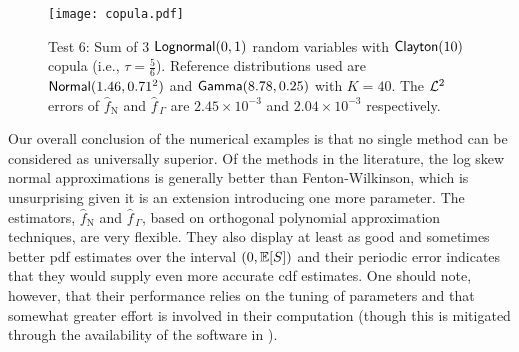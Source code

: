 \begin{figure}
\centering
\texttt{[image: copula.pdf]}
\caption*{Test 6: Sum of 3 $\mathsf{Lognormal}(0,1)$ random variables with $\mathsf{Clayton}(10)$ copula (i.e., $\tau = \frac56$). Reference distributions used are $\mathsf{Normal}(1.46,0.71^2)$ and $\mathsf{Gamma}(8.78,0.25)$ with $K = 40$. The $\mathcal{L}^2$ errors of $\widehat{f}_{\mathrm{N}}$ and $\widehat{f}_{\,\Gamma}$ are $2.45 \times 10^{-3}$ and $2.04 \times 10^{-3}$ respectively.}
\end{figure}







Our overall conclusion of the numerical examples is that no single method can
be considered as universally superior. Of the methods in the literature,
the log skew normal approximations is generally better than Fenton-Wilkinson,
which is unsurprising given it is an extension introducing one more parameter.
The estimators, $\widehat{f}_{\mathrm{N}}$ and $\widehat{f}_{\,\Gamma}$, based on orthogonal polynomial approximation techniques, are very flexible. They also display at least as good and sometimes better pdf estimates over the interval $(0, \operatorname{{\mathbb E}}[S])$ and their periodic error indicates that they would supply even more accurate cdf estimates. One should note, however, that their
performance relies on the tuning of parameters and that somewhat
greater effort is involved in their computation (though this is mitigated through the availability
of the software in \cite{OrthogoCode}).

